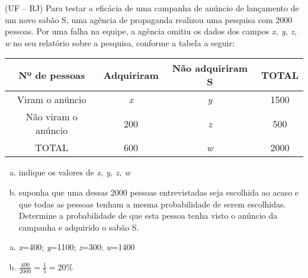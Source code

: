 \begin{ex}
(UF – RJ) Para testar a eficácia de uma campanha de anúncio de lançamento de um novo sabão S, uma agência de propaganda realizou uma pesquisa com 2000 pessoas. Por uma falha na equipe, a agência omitiu os dados dos campos \textit{x, y, z, w}  no seu relatório sobre a pesquisa, conforme a tabela a seguir:
\begin{center}
\begin{tabular}{|c|c|c|c|} \hline
Nº de pessoas  &  Adquiriram & Não adquiriram S & TOTAL\\  \hline
Viram o anúncio & \textit{x} & \textit{y} & 1500 \\  \hline
Não viram o anúncio  & 200 & \textit{z}  & 500 \\  \hline
TOTAL & 600 & \textit{w} & 2000 \\  \hline
\end{tabular}
\end{center}
   \begin{enumerate}[(a)]
   \item indique os valores de \textit{x, y, z, w}
   \item suponha que uma dessas 2000 pessoas entrevistadas seja escolhida ao acaso e que todas as pessoas tenham a mesma probabilidade de serem escolhidas. Determine a probabilidade de que esta pessoa tenha visto o anúncio da campanha e adquirido o sabão S.
   \end{enumerate}
     \begin{sol}
       \phantom{A}
       \begin{enumerate} [(a)]
        \item \textit{x}=400; \textit{y}=1100; 
        \textit{z}=300; \textit{w}=1400
        \item $\frac{400}{2000}=\frac{1}{5}=20\%$
       \end{enumerate}
      \end{sol}
\end{ex}